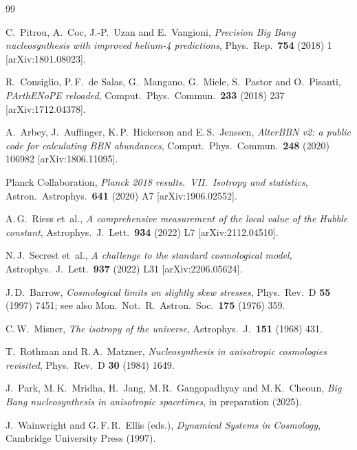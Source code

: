 \documentclass[a4paper,11pt]{article}
\begin{document}
\begin{thebibliography}{99}

C.~Pitrou, A.~Coc, J.-P.~Uzan and E.~Vangioni,
\textit{Precision Big Bang nucleosynthesis with improved helium-4 predictions},
Phys.\ Rep.\ \textbf{754} (2018) 1 [arXiv:1801.08023].

R.~Consiglio, P.\,F.~de Salas, G.~Mangano, G.~Miele, S.~Pastor and O.~Pisanti,
\textit{PArthENoPE reloaded},
Comput.\ Phys.\ Commun.\ \textbf{233} (2018) 237 [arXiv:1712.04378].

A.~Arbey, J.~Auffinger, K.\,P.~Hickerson and E.\,S.~Jenssen,
\textit{AlterBBN v2: a public code for calculating BBN abundances},
Comput.\ Phys.\ Commun.\ \textbf{248} (2020) 106982 [arXiv:1806.11095].

Planck Collaboration,
\textit{Planck 2018 results.~VII.\ Isotropy and statistics},
Astron.\ Astrophys.\ \textbf{641} (2020) A7 [arXiv:1906.02552].

A.\,G.~Riess et~al.,
\textit{A comprehensive measurement of the local value of the Hubble constant},
Astrophys.\ J.\ Lett.\ \textbf{934} (2022) L7 [arXiv:2112.04510].

N.\,J.~Secrest et~al.,
\textit{A challenge to the standard cosmological model},
Astrophys.\ J.\ Lett.\ \textbf{937} (2022) L31 [arXiv:2206.05624].

J.\,D.~Barrow,
\textit{Cosmological limits on slightly skew stresses},
Phys.\ Rev.\ D \textbf{55} (1997) 7451;
see also Mon.\ Not.\ R.\ Astron.\ Soc.\ \textbf{175} (1976) 359.

C.\,W.~Misner,
\textit{The isotropy of the universe},
Astrophys.\ J.\ \textbf{151} (1968) 431.

T.~Rothman and R.\,A.~Matzner,
\textit{Nucleosynthesis in anisotropic cosmologies revisited},
Phys.\ Rev.\ D \textbf{30} (1984) 1649.

J.~Park, M.\,K.~Mridha, H.~Jang, M.\,R.~Gangopadhyay and M.\,K.~Cheoun,
\textit{Big Bang nucleosynthesis in anisotropic spacetimes},
in preparation (2025).

J.~Wainwright and G.\,F.\,R.~Ellis (eds.),
\textit{Dynamical Systems in Cosmology},
Cambridge University Press (1997).


\end{thebibliography}
\end{document}
